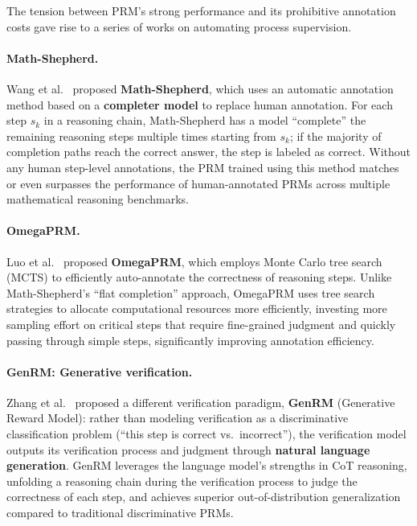 The tension between PRM's strong performance and its prohibitive annotation costs gave rise to a series of works on automating process supervision.

\paragraph{Math-Shepherd.}
Wang et al.\ \cite{wang2024mathshepherd} proposed \textbf{Math-Shepherd},
which uses an automatic annotation method based on a \textbf{completer model} to replace human annotation.
For each step $s_k$ in a reasoning chain,
Math-Shepherd has a model ``complete'' the remaining reasoning steps multiple times starting from $s_k$;
if the majority of completion paths reach the correct answer, the step is labeled as correct.
Without any human step-level annotations,
the PRM trained using this method matches or even surpasses the performance of human-annotated PRMs across multiple mathematical reasoning benchmarks.

\paragraph{OmegaPRM.}
Luo et al.\ \cite{luo2024omegaprm} proposed \textbf{OmegaPRM},
which employs Monte Carlo tree search (MCTS) to efficiently auto-annotate the correctness of reasoning steps.
Unlike Math-Shepherd's ``flat completion'' approach,
OmegaPRM uses tree search strategies to allocate computational resources more efficiently,
investing more sampling effort on critical steps that require fine-grained judgment
and quickly passing through simple steps, significantly improving annotation efficiency.

\paragraph{GenRM: Generative verification.}
Zhang et al.\ \cite{zhang2024genrm} proposed a different verification paradigm, \textbf{GenRM}
(Generative Reward Model):
rather than modeling verification as a discriminative classification problem (``this step is correct vs.\ incorrect''),
the verification model outputs its verification process and judgment through \textbf{natural language generation}.
GenRM leverages the language model's strengths in CoT reasoning,
unfolding a reasoning chain during the verification process to judge the correctness of each step,
and achieves superior out-of-distribution generalization compared to traditional discriminative PRMs.

